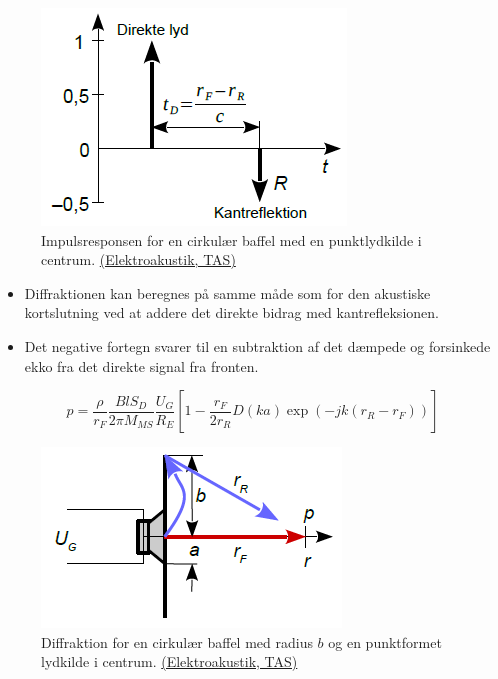\begin{figure} [H]
	\centering
	\includegraphics[width=0.5\linewidth]{graphics/54.png}
	\caption{Impulsresponsen for en cirkulær baffel med en punktlydkilde i centrum. \href{http://www.torean.dk/artikel/Elektroakustik.pdf}{(Elektroakustik, TAS)}}
	\label{fig:54}
\end{figure}

\begin{itemize}
	\item Diffraktionen kan beregnes på samme måde som for den akustiske kortslutning ved at addere det direkte bidrag med kantrefleksionen.
	\item Det negative fortegn svarer til en subtraktion af det dæmpede og forsinkede ekko fra det direkte signal fra fronten.
\end{itemize}

\begin{equation}
p = \dfrac{\rho}{r_F}\dfrac{Bl S_D}{2\pi M_{MS}}\dfrac{U_G}{R_E}\left[1-\dfrac{r_F}{2r_R}D(ka)\exp(-jk(r_R-r_F))\right]
\end{equation}

\begin{figure} [H]
	\centering
	\includegraphics[width=0.5\linewidth]{graphics/55.png}
	\caption{Diffraktion for en cirkulær baffel med radius $b$ og en punktformet lydkilde i centrum. \href{http://www.torean.dk/artikel/Elektroakustik.pdf}{(Elektroakustik, TAS)}}
	\label{fig:55}
\end{figure}

